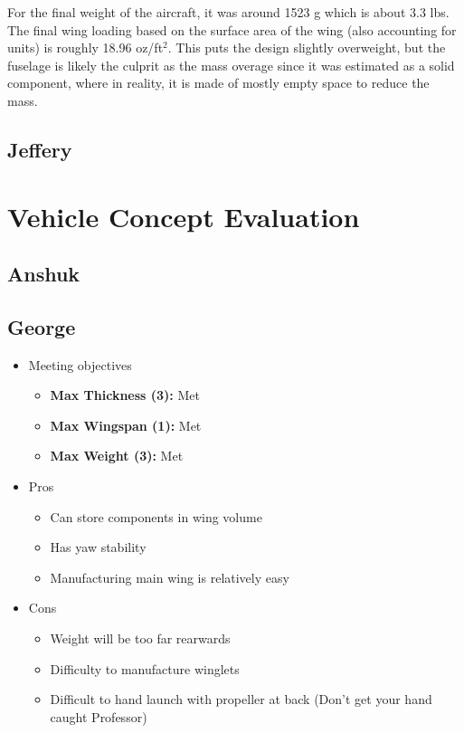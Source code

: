         For the final weight of the aircraft, it was around 1523 g which is about 3.3 lbs. The final wing loading based on the surface area of the wing (also accounting for units) is roughly 18.96 oz/ft$^2$. This puts the design slightly overweight, but the fuselage is likely the culprit as the mass overage since it was estimated as a solid component, where in reality, it is made of mostly empty space to reduce the mass. 
        
    \subsection{Jeffery}
        

\section{Vehicle Concept Evaluation}

    \subsection{Anshuk}
    \subsection{George}
        \begin{itemize}
            \item Meeting objectives
            \begin{itemize}
                \item \textbf{Max Thickness (3):} Met
                \item \textbf{Max Wingspan (1):} Met
                \item \textbf{Max Weight (3):} Met
            \end{itemize}
            \item Pros
            \begin{itemize}
                \item Can store components in wing volume
                \item Has yaw stability
                \item Manufacturing main wing is relatively easy
            \end{itemize}
            \item Cons
            \begin{itemize}
                \item Weight will be too far rearwards
                \item Difficulty to manufacture winglets
                \item Difficult to hand launch with propeller at back (Don't get your hand caught Professor)
            \end{itemize}
        \end{itemize}
